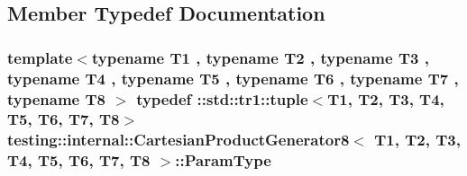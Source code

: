 \subsection{Member Typedef Documentation}
\hypertarget{classtesting_1_1internal_1_1_cartesian_product_generator8_ac0ce78b904e9a155d0f0711b9012ec0b}{
\subsubsection[{Param\-Type}]{\setlength{\rightskip}{0pt plus 5cm}template$<$typename T1 , typename T2 , typename T3 , typename T4 , typename T5 , typename T6 , typename T7 , typename T8 $>$ typedef \-::{\bf std\-::tr1\-::tuple}$<$T1, T2, T3, T4, T5, T6, T7, T8$>$ {\bf testing\-::internal\-::\-Cartesian\-Product\-Generator8}$<$ T1, T2, T3, T4, T5, T6, T7, T8 $>$\-::{\bf Param\-Type}}}\label{classtesting_1_1internal_1_1_cartesian_product_generator8_ac0ce78b904e9a155d0f0711b9012ec0b}


